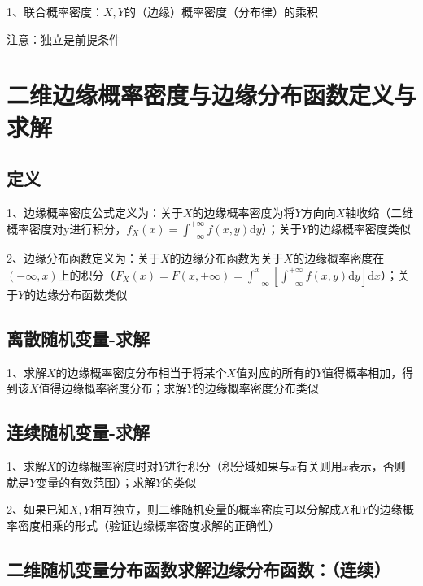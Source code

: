 1、联合概率密度：$X,Y$的（边缘）概率密度（分布律）的乘积

注意：独立是前提条件

\section{二维边缘概率密度与边缘分布函数定义与求解}



\subsection{定义}

1、边缘概率密度公式定义为：关于$X$的边缘概率密度为将$Y$方向向$X$轴收缩（二维概率密度对y进行积分，$f_{X}(x)=\int_{-\infty}^{+\infty} f(x, y) \mathrm{d} y$）；关于$Y$的边缘概率密度类似

2、边缘分布函数定义为：关于$X$的边缘分布函数为关于$X$的边缘概率密度在$(-\infty,x)$上的积分（$F_{X}(x)=F(x,+\infty)=\int_{-\infty}^{x}\left[\int_{-\infty}^{+\infty} f(x, y) \mathrm{d} y\right] \mathrm{d} x$）；关于$Y$的边缘分布函数类似



\subsection{离散随机变量-求解}

1、求解$X$的边缘概率密度分布相当于将某个$X$值对应的所有的$Y$值得概率相加，得到该$X$值得边缘概率密度分布；求解$Y$的边缘概率密度分布类似



\subsection{连续随机变量-求解}

1、求解$X$的边缘概率密度时对$Y$进行积分（积分域如果与$x$有关则用$x$表示，否则就是$Y$变量的有效范围）；求解$Y$的类似

2、如果已知$X,Y$相互独立，则二维随机变量的概率密度可以分解成$X$和$Y$的边缘概率密度相乘的形式（验证边缘概率密度求解的正确性）



\subsection{二维随机变量分布函数求解边缘分布函数：（连续）}

